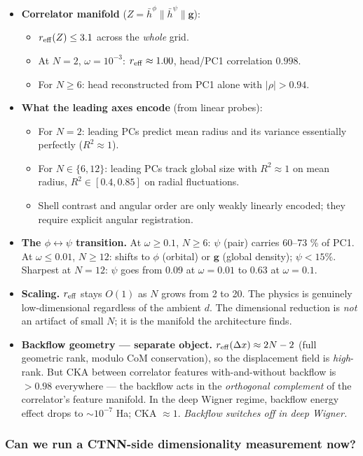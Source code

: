 \documentclass[11pt]{article}
\begin{document}
\begin{itemize}
variance.
\item \textbf{Correlator manifold} ($Z = \bar h^\phi \| \bar h^\psi \| \mathbf g$):
\begin{itemize}
\item $r_{\rm eff}(Z) \le 3.1$ across the \emph{whole} grid.
\item At $N = 2$, $\omega = 10^{-3}$: $r_{\rm eff} \approx 1.00$, head/PC1
correlation $0.998$.
\item For $N \ge 6$: head reconstructed from PC1 alone with $|\rho| > 0.94$.
\end{itemize}
\item \textbf{What the leading axes encode} (from linear probes):
\begin{itemize}
\item For $N = 2$: leading PCs predict mean radius and its variance
essentially perfectly ($R^2 \approx 1$).
\item For $N \in \{6, 12\}$: leading PCs track global size with $R^2 \approx
    1$ on mean radius, $R^2 \in [0.4, 0.85]$ on radial fluctuations.
\item Shell contrast and angular order are only weakly linearly encoded;
they require explicit angular registration.
\end{itemize}
\item \textbf{The $\phi \leftrightarrow \psi$ transition.} At $\omega \ge 0.1$, $N
  \ge 6$: $\psi$ (pair) carries 60--73 \% of PC1. At $\omega \le 0.01$, $N
  \ge 12$: shifts to $\phi$ (orbital) or $\mathbf g$ (global density);
$\psi < 15\%$. Sharpest at $N = 12$: $\psi$ goes from 0.09 at $\omega =
  0.01$ to 0.63 at $\omega = 0.1$.
\item \textbf{Scaling.} $r_{\rm eff}$ stays $O(1)$ as $N$ grows from 2 to 20.
The physics is genuinely low-dimensional regardless of the ambient $d$.
The dimensional reduction is \emph{not} an artifact of small $N$; it is
the manifold the architecture finds.
\item \textbf{Backflow geometry --- separate object.} $r_{\rm eff}(\Delta x) \approx
  2N - 2$ (full geometric rank, modulo CoM conservation), so the
displacement field is \emph{high}-rank. But CKA between correlator features
with-and-without backflow is $> 0.98$ everywhere --- the backflow acts
in the \emph{orthogonal complement} of the correlator's feature manifold.
In the deep Wigner regime, backflow energy effect drops to $\sim 10^{-7}$
Ha; CKA $\approx 1$. \emph{Backflow switches off in deep Wigner.}
\end{itemize}
\subsubsection*{Can we run a CTNN-side dimensionality measurement now?}
\end{document}
